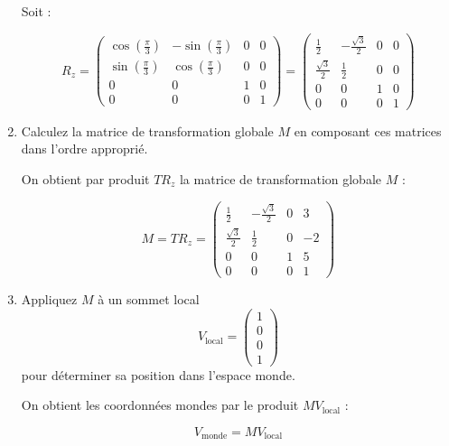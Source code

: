 \documentclass[a4paper,12pt]{article}
\begin{document}
\begin{enumerate}
    Soit :

    \[
    R_z = 
    \begin{pmatrix}
    \cos(\frac{\pi}{3}) & -\sin(\frac{\pi}{3}) & 0 & 0 \\
    \sin(\frac{\pi}{3}) & \cos(\frac{\pi}{3}) & 0 & 0 \\
    0 & 0 & 1 & 0 \\
    0 & 0 & 0 & 1
    \end{pmatrix} 
    =
    \begin{pmatrix}
    \frac{1}{2} & -\frac{\sqrt{3}}{2} & 0 & 0 \\
    \frac{\sqrt{3}}{2} & \frac{1}{2} & 0 & 0 \\
    0 & 0 & 1 & 0 \\
    0 & 0 & 0 & 1
    \end{pmatrix} 
    \]

    \newpage

  \item Calculez la matrice de transformation globale \(M\) en composant ces matrices dans l'ordre approprié.

    On obtient par produit $T R_z$ la matrice de transformation globale \(M\) :

    \[
    M = T R_z =
    \begin{pmatrix}
    \frac{1}{2} & -\frac{\sqrt{3}}{2} & 0 & 3 \\
    \frac{\sqrt{3}}{2} & \frac{1}{2} & 0 & -2 \\
    0 & 0 & 1 & 5 \\
    0 & 0 & 0 & 1
    \end{pmatrix} 
    \]


  \item Appliquez \(M\) à un sommet local 
  \[
  V_{\text{local}} = \begin{pmatrix} 1 \\ 0 \\ 0 \\ 1 \end{pmatrix}
  \]
  pour déterminer sa position dans l'espace monde. \newline

    On obtient les coordonnées mondes par le produit $M V_{\text{local}}$ :

    \[
    V_{\text{monde}} = M V_{\text{local}}
    \]


\end{enumerate}
\end{document}
